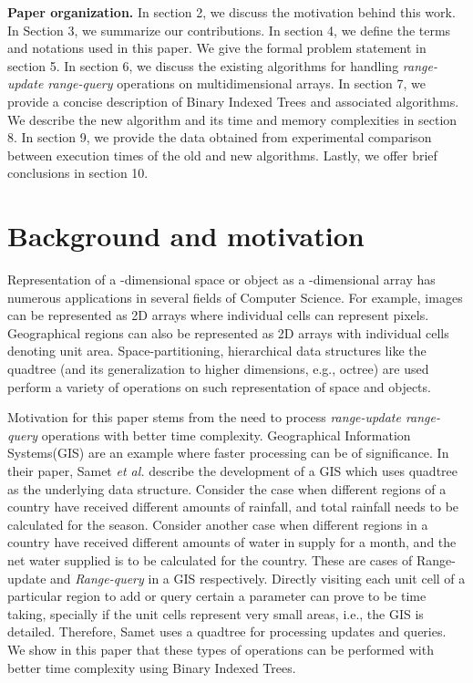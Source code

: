 \documentclass[a4paper]{article}
\begin{document}
\vspace{2 mm}
\noindent
\textbf{Paper organization.} In section 2, we discuss the motivation behind this work. In Section 3, we summarize our contributions. In section 4, we define the terms and notations used in this paper. We give the formal problem statement in section 5. In section 6, we discuss the existing algorithms for handling \textit{range-update range-query} operations on multidimensional arrays. In section 7, we provide a concise description of Binary Indexed Trees and associated algorithms. We describe the new algorithm and its time and memory complexities in section 8. In section 9, we provide the data obtained from experimental comparison between execution times of the old and new algorithms. Lastly, we offer brief conclusions in section 10.



\section{Background and motivation}
Representation of a -dimensional space or object as a -dimensional array has numerous applications in several fields of Computer Science. For example, images can be represented as 2D arrays where individual cells can represent pixels. Geographical regions can also be represented as 2D arrays with individual cells denoting unit area. Space-partitioning, hierarchical data structures like the quadtree (and its generalization to higher dimensions, e.g., octree) are used perform a variety of operations on such representation of space and objects\cite{HS2}.

\vspace{2 mm}
Motivation for this paper stems from the need to process \textit{range-update range-query} operations with better time complexity. Geographical Information Systems(GIS) are an example where faster processing can be of significance.  In their paper\cite{GIS}, Samet \textit{et al.} describe the development of a GIS which uses quadtree as the underlying data structure. Consider the case when different regions of a country have received different amounts of rainfall, and total rainfall needs to be calculated for the season. Consider another case when different regions in a country have received different amounts of water in supply for a month, and the net water supplied is to be calculated for the country. These are cases of Range-update and \textit{Range-query} in a GIS respectively. Directly visiting each unit cell of a particular region to add or query certain a parameter can prove to be time taking, specially if the unit cells represent very small areas, i.e., the GIS is detailed. Therefore, Samet uses a quadtree for processing updates and queries. We show in this paper that these types of operations can be performed with better time complexity using Binary Indexed Trees.
\end{document}
